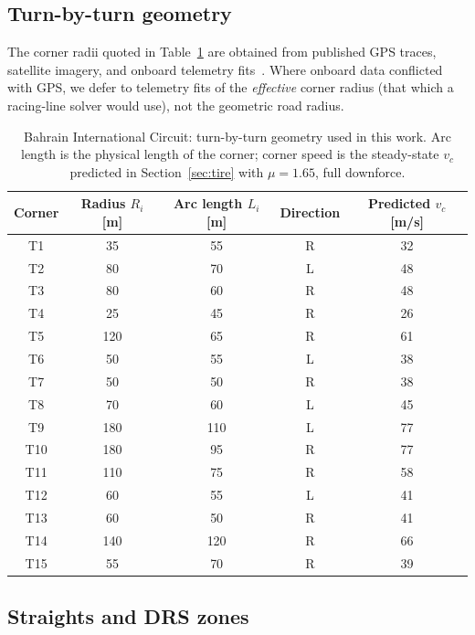\documentclass[11pt,twocolumn]{article}
\theoremstyle{definition}
\theoremstyle{remark}
\begin{document}
\subsection{Turn-by-turn geometry}

The corner radii quoted in Table~\ref{tab:corners} are obtained from published
GPS traces, satellite imagery, and onboard telemetry fits~\cite{fastf12024,ergast2024}. Where onboard data
conflicted with GPS, we defer to telemetry fits of the \emph{effective} corner
radius (that which a racing-line solver would use), not the geometric road
radius.

\begin{table}[!t]
\centering
\caption{Bahrain International Circuit: turn-by-turn geometry used in this
work. Arc length is the physical length of the corner; corner speed is the
steady-state $v_c$ predicted in Section~\ref{sec:tire} with
$\mu=1.65$, full downforce.}
\label{tab:corners}
\begin{tabular}{ccccc}
\toprule
Corner & Radius $R_i$ [m] & Arc length $L_i$ [m] & Direction & Predicted $v_c$ [m/s] \\
\midrule
T1   & 35   & 55  & R & 32 \\
T2   & 80   & 70  & L & 48 \\
T3   & 80   & 60  & R & 48 \\
T4   & 25   & 45  & R & 26 \\
T5   & 120  & 65  & R & 61 \\
T6   & 50   & 55  & L & 38 \\
T7   & 50   & 50  & R & 38 \\
T8   & 70   & 60  & L & 45 \\
T9   & 180  & 110 & L & 77 \\
T10  & 180  & 95  & R & 77 \\
T11  & 110  & 75  & R & 58 \\
T12  & 60   & 55  & L & 41 \\
T13  & 60   & 50  & R & 41 \\
T14  & 140  & 120 & R & 66 \\
T15  & 55   & 70  & R & 39 \\
\bottomrule
\end{tabular}
\end{table}

\subsection{Straights and DRS zones}
\end{document}
